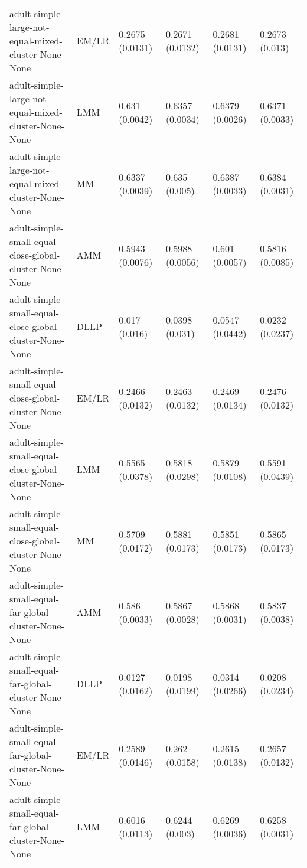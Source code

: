\begin{tabular}{llllll}
                                   adult-simple-large-not-equal-mixed-cluster-None-None &     EM/LR & 0.2675 (0.0131) &  0.2671 (0.0132) &   0.2681 (0.0131) &      0.2673 (0.013) \\
                                   adult-simple-large-not-equal-mixed-cluster-None-None &       LMM &  0.631 (0.0042) &  0.6357 (0.0034) &   0.6379 (0.0026) &     0.6371 (0.0033) \\
                                   adult-simple-large-not-equal-mixed-cluster-None-None &        MM & 0.6337 (0.0039) &    0.635 (0.005) &   0.6387 (0.0033) &     0.6384 (0.0031) \\
                                adult-simple-small-equal-close-global-cluster-None-None &       AMM & 0.5943 (0.0076) &  0.5988 (0.0056) &    0.601 (0.0057) &     0.5816 (0.0085) \\
                                adult-simple-small-equal-close-global-cluster-None-None &      DLLP &   0.017 (0.016) &   0.0398 (0.031) &   0.0547 (0.0442) &     0.0232 (0.0237) \\
                                adult-simple-small-equal-close-global-cluster-None-None &     EM/LR & 0.2466 (0.0132) &  0.2463 (0.0132) &   0.2469 (0.0134) &     0.2476 (0.0132) \\
                                adult-simple-small-equal-close-global-cluster-None-None &       LMM & 0.5565 (0.0378) &  0.5818 (0.0298) &   0.5879 (0.0108) &     0.5591 (0.0439) \\
                                adult-simple-small-equal-close-global-cluster-None-None &        MM & 0.5709 (0.0172) &  0.5881 (0.0173) &   0.5851 (0.0173) &     0.5865 (0.0173) \\
                                  adult-simple-small-equal-far-global-cluster-None-None &       AMM &  0.586 (0.0033) &  0.5867 (0.0028) &   0.5868 (0.0031) &     0.5837 (0.0038) \\
                                  adult-simple-small-equal-far-global-cluster-None-None &      DLLP & 0.0127 (0.0162) &  0.0198 (0.0199) &   0.0314 (0.0266) &     0.0208 (0.0234) \\
                                  adult-simple-small-equal-far-global-cluster-None-None &     EM/LR & 0.2589 (0.0146) &   0.262 (0.0158) &   0.2615 (0.0138) &     0.2657 (0.0132) \\
                                  adult-simple-small-equal-far-global-cluster-None-None &       LMM & 0.6016 (0.0113) &   0.6244 (0.003) &   0.6269 (0.0036) &     0.6258 (0.0031) \\

\end{tabular}
